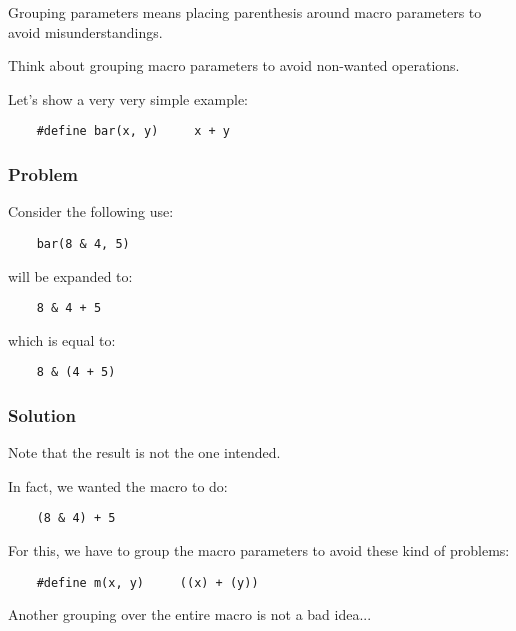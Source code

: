 {\begin{frame}[containsverbatim]
  Grouping parameters means placing parenthesis around macro parameters
  to avoid misunderstandings.

  \nl

  Think about grouping macro parameters to avoid non-wanted operations.

  \nl

  Let's show a very very simple example:

  \begin{verbatim}
    #define bar(x, y)     x + y
  \end{verbatim}
\end{frame}


\begin{frame}[containsverbatim]
  \frametitle{Problem}

  Consider the following use:

  \begin{verbatim}
    bar(8 & 4, 5)
  \end{verbatim}

  will be expanded to:

  \begin{verbatim}
    8 & 4 + 5
  \end{verbatim}

  which is equal to:

  \begin{verbatim}
    8 & (4 + 5)
  \end{verbatim}
\end{frame}


\begin{frame}[containsverbatim]
  \frametitle{Solution}

  Note that the result is not the one intended.

  \nl

  In fact, we wanted the macro to do:

  \begin{verbatim}
    (8 & 4) + 5
  \end{verbatim}

  For this, we have to group the macro parameters to avoid these kind of
  problems:

  \begin{verbatim}
    #define m(x, y)     ((x) + (y))
  \end{verbatim}

  Another grouping over the entire macro is not a bad idea...
\end{frame}

}
